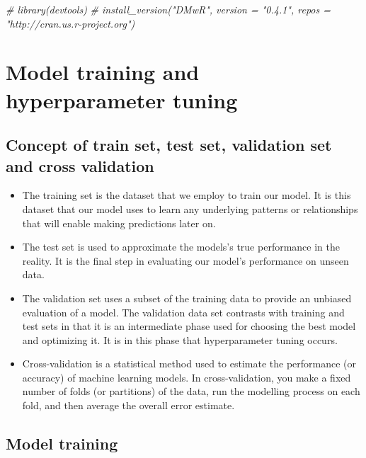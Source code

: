 \documentclass[
]{book}
\newenvironment{Shaded}{\begin{snugshade}}{\end{snugshade}}
\newcommand{\CommentTok}[1]{\textcolor[rgb]{0.56,0.35,0.01}{\textit{#1}}}
\providecommand{\tightlist}{%
  \setlength{\itemsep}{0pt}\setlength{\parskip}{0pt}}
\begin{document}
\begin{Shaded}
\begin{Highlighting}[]
\CommentTok{\# library(devtools)}
\CommentTok{\# install\_version("DMwR", version = "0.4.1",  repos = "http://cran.us.r{-}project.org")}
\end{Highlighting}
\end{Shaded}

\hypertarget{model-training-and-hyperparameter-tuning}{%
\chapter{Model training and hyperparameter tuning}\label{model-training-and-hyperparameter-tuning}}

\hypertarget{concept-of-train-set-test-set-validation-set-and-cross-validation}{%
\section{Concept of train set, test set, validation set and cross validation}\label{concept-of-train-set-test-set-validation-set-and-cross-validation}}

\begin{itemize}
\tightlist
\item
  The training set is the dataset that we employ to train our model. It is this dataset that our model uses to learn any underlying patterns or relationships that will enable making predictions later on.
\item
  The test set is used to approximate the models's true performance in the reality. It is the final step in evaluating our model's performance on unseen data.
\item
  The validation set uses a subset of the training data to provide an unbiased evaluation of a model. The validation data set contrasts with training and test sets in that it is an intermediate phase used for choosing the best model and optimizing it. It is in this phase that hyperparameter tuning occurs.
\item
  Cross-validation is a statistical method used to estimate the performance (or accuracy) of machine learning models. In cross-validation, you make a fixed number of folds (or partitions) of the data, run the modelling process on each fold, and then average the overall error estimate.
\end{itemize}

\hypertarget{model-training}{%
\section{Model training}\label{model-training}}
\end{document}
